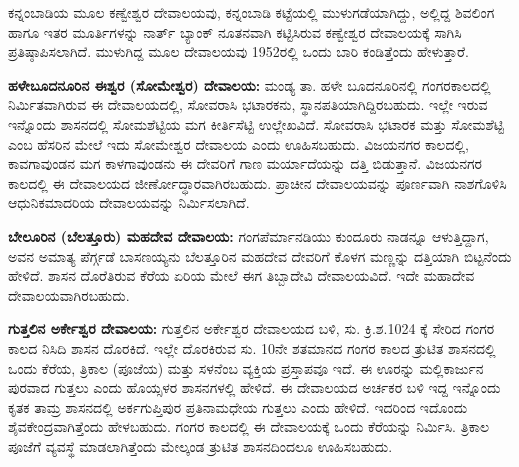 ಕನ್ನಂಬಾಡಿಯ ಮೂಲ ಕಣ್ವೇಶ್ವರ ದೇವಾಲಯವು, ಕನ್ನಂಬಾಡಿ ಕಟ್ಟೆಯಲ್ಲಿ ಮುಳುಗಡೆಯಾಗಿದ್ದು, ಅಲ್ಲಿದ್ದ ಶಿವಲಿಂಗ ಹಾಗೂ ಇತರ ಮೂರ್ತಿಗಳನ್ನು ನಾರ್ತ್ ಬ್ಯಾಂಕ್ ನೂತನವಾಗಿ ಕಟ್ಟಿಸಿರುವ ಕಣ್ವೇಶ್ವರ ದೇವಾಲಯಕ್ಕೆ ಸಾಗಿಸಿ ಪ್ರತಿಷ್ಠಾಪಿಸಲಾಗಿದೆ. ಮುಳುಗಿದ್ದ ಮೂಲ ದೇವಾಲಯವು 1952ರಲ್ಲಿ ಒಂದು ಬಾರಿ ಕಂಡಿತ್ತೆಂದು ಹೇಳುತ್ತಾರೆ.

\textbf{ಹಳೇಬೂದನೂರಿನ ಈಶ್ವರ (ಸೋಮೇಶ್ವರ) ದೇವಾಲಯ:} ಮಂಡ್ಯ ತಾ. ಹಳೇ ಬೂದನೂರಿನಲ್ಲಿ ಗಂಗರಕಾಲದಲ್ಲಿ ನಿರ್ಮಿತವಾಗಿರುವ ಈ ದೇವಾಲಯ\-ದಲ್ಲಿ, ಸೋವರಾಸಿ ಭಟಾರಕನು, ಸ್ಥಾನಪತಿಯಾಗಿದ್ದಿರಬಹುದು. ಇಲ್ಲೇ ಇರುವ ಇನ್ನೊಂದು ಶಾಸನದಲ್ಲಿ ಸೋಮಶೆಟ್ಟಿಯ ಮಗ ಕೀರ್ತಿಸೆಟ್ಟಿ ಉಲ್ಲೇಖವಿದೆ. ಸೋವರಾಸಿ ಭಟಾರಕ ಮತ್ತು ಸೋಮಶೆಟ್ಟಿ ಎಂಬ ಹೆಸರಿನ ಮೇಲೆ ಇದು ಸೋಮೇಶ್ವರ ದೇವಾಲಯ ಎಂದು ಊಹಿಸಬಹುದು. ವಿಜಯನಗರ ಕಾಲದಲ್ಲಿ, ಕಾವಗಾವುಂಡನ ಮಗ ಕಾಳಗಾವುಂಡನು ಈ ದೇವರಿಗೆ ಗಾಣ ಮರ್ಯಾದೆಯನ್ನು ದತ್ತಿ ಬಿಡುತ್ತಾನೆ. ವಿಜಯನಗರ ಕಾಲದಲ್ಲಿ ಈ ದೇವಾಲಯದ ಜೀರ್ಣೋದ್ಧಾರವಾಗಿರಬಹುದು. ಪ್ರಾಚೀನ ದೇವಾಲಯವನ್ನು ಪೂರ್ಣವಾಗಿ ನಾಶಗೊಳಿಸಿ ಆಧುನಿಕ\break ಮಾದರಿಯ ದೇವಾಲಯವನ್ನು ನಿರ್ಮಿಸಲಾಗಿದೆ.

\textbf{ಬೇಲೂರಿನ (ಬೆಲತ್ತೂರು) ಮಹದೇವ ದೇವಾಲಯ:} ಗಂಗಪೆರ್ಮಾನಡಿಯು ಕುಂದೂರು ನಾಡನ್ನೂ ಆಳುತ್ತಿದ್ದಾಗ, ಅವನ ಅಮಾತ್ಯ ಪೆರ್ಗ್ಗಡೆ ಬಾಸಣಯ್ಯನು ಬೆಲತ್ತೂರಿನ ಮಹದೇವ ದೇವರಿಗೆ ಕೊಳಗ ಮಣ್ಣನ್ನು ದತ್ತಿಯಾಗಿ ಬಿಟ್ಟನೆಂದು ಹೇಳಿದೆ. ಶಾಸನ ದೊರೆತಿರುವ ಕೆರೆಯ ಏರಿಯ ಮೇಲೆ ಈಗ ತಿಬ್ಬಾದೇವಿ ದೇವಾಲಯವಿದೆ. ಇದೇ ಮಹಾದೇವ ದೇವಾಲಯವಾಗಿರಬಹುದು.

\textbf{ಗುತ್ತಲಿನ ಅರ್ಕೇಶ್ವರ ದೇವಾಲಯ:} ಗುತ್ತಲಿನ ಅರ್ಕೇಶ್ವರ ದೇವಾಲಯದ ಬಳಿ, ಸು. ಕ್ರಿ.ಶ.1024 ಕ್ಕೆ ಸೇರಿದ ಗಂಗರ ಕಾಲದ ನಿಸಿದಿ ಶಾಸನ ದೊರಕಿದೆ. ಇಲ್ಲೇ ದೊರಕಿರುವ ಸು. 10ನೇ ಶತಮಾನದ ಗಂಗರ ಕಾಲದ ತ್ರುಟಿತ ಶಾಸನದಲ್ಲಿ ಒಂದು ಕೆರೆಯ, ತ್ರಿಕಾಲ (ಪೂಜೆಯ) ಮತ್ತು ಸಳನೆಂಬ ವ್ಯಕ್ತಿಯ ಪ್ರಸ್ತಾಪವೂ ಇದೆ. ಈ ಊರನ್ನು ಮಲ್ಲಿಕಾರ್ಜುನ ಪುರವಾದ ಗುತ್ತಲು ಎಂದು ಹೊಯ್ಸಳರ ಶಾಸನಗಳಲ್ಲಿ ಹೇಳಿದೆ. ಈ ದೇವಾಲಯದ ಅರ್ಚಕರ ಬಳಿ ಇದ್ದ ಇನ್ನೊಂದು ಕೃತಕ ತಾಮ್ರ ಶಾಸನದಲ್ಲಿ ಅರ್ಕಗುಪ್ತಿಪುರ ಪ್ರತಿನಾಮಧೇಯ ಗುತ್ತಲು ಎಂದು ಹೇಳಿದೆ. ಇದರಿಂದ ಇದೊಂದು ಶೈವಕೇಂದ್ರವಾಗಿತ್ತೆಂದು ಹೇಳಬಹುದು. ಗಂಗರ ಕಾಲದಲ್ಲಿ ಈ ದೇವಾಲಯಕ್ಕೆ ಒಂದು ಕೆರೆಯನ್ನು ನಿರ್ಮಿಸಿ. ತ್ರಿಕಾಲ ಪೂಜೆಗೆ ವ್ಯವಸ್ಥೆ ಮಾಡಲಾಗಿತ್ತೆಂದು ಮೇಲ್ಕಂಡ ತ್ರುಟಿತ ಶಾಸನದಿಂದಲೂ ಊಹಿಸಬಹುದು.

